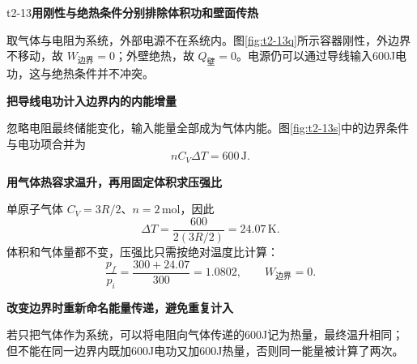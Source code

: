 \begin{drillsolution}{t2-13}\textbf{用刚性与绝热条件分别排除体积功和壁面传热}\par\nobreak
取气体与电阻为系统，外部电源不在系统内。图\ref{fig:t2-13q}所示容器刚性，外边界不移动，故 $W_{\text{边界}}=0$；外壁绝热，故 $Q_{\text{壁}}=0$。电源仍可以通过导线输入600J电功，这与绝热条件并不冲突。


\par\medskip{}\noindent\textbf{把导线电功计入边界内的内能增量}\par\nobreak
忽略电阻最终储能变化，输入能量全部成为气体内能。图\ref{fig:t2-13s}中的边界条件与电功项合并为
\[nC_V\Delta T=600\,\mathrm J.\]



\par\medskip{}\noindent\textbf{用气体热容求温升，再用固定体积求压强比}\par\nobreak
单原子气体 $C_V=3R/2$、$n=2\,\mathrm{mol}$，因此
\[\boxed{\Delta T=\frac{600}{2(3R/2)}=24.07\,\mathrm K}.\]
体积和气体量都不变，压强比只需按绝对温度比计算：
\[\boxed{\frac{p_f}{p_i}=\frac{300+24.07}{300}=1.0802,\qquad W_{\text{边界}}=0}.\]


\par\medskip{}\noindent\textbf{改变边界时重新命名能量传递，避免重复计入}\par\nobreak
若只把气体作为系统，可以将电阻向气体传递的600J记为热量，最终温升相同；但不能在同一边界内既加600J电功又加600J热量，否则同一能量被计算了两次。
\end{drillsolution}
